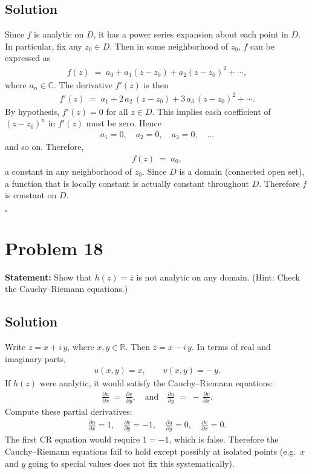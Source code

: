 \documentclass[12pt]{article}
\theoremstyle{definition} %
\theoremstyle{plain} %
\begin{document}
\subsection*{Solution}
Since $f$ is analytic on $D$, it has a power series expansion about each point in $D$.  In particular, fix any $z_0 \in D$.  Then in some neighborhood of $z_0$, $f$ can be expressed as
\begin{align}
f(z) \;=\; a_0 + a_1(z - z_0) + a_2(z - z_0)^2 + \cdots,
\end{align}
where $a_n \in \mathbb{C}$.  The derivative $f'(z)$ is then
\begin{align}
f'(z)
\;=\;
a_1 + 2\,a_2\, (z-z_0) + 3\,a_3\, (z - z_0)^2 + \cdots.
\end{align}
By hypothesis, $f'(z) = 0$ for all $z \in D$.  This implies each coefficient of $(z - z_0)^n$ in $f'(z)$ must be zero. Hence
\begin{align}
a_1 = 0, \quad a_2 = 0, \quad a_3=0,\quad \dots
\end{align}
and so on.  Therefore,
\begin{align}
f(z) \;=\; a_0,
\end{align}
a constant in any neighborhood of $z_0$.  Since $D$ is a domain (connected open set), a function that is locally constant is actually constant throughout $D$.  Therefore $f$ is constant on $D$.

\quad $\square$

\section*{Problem 18}
\textbf{Statement:} Show that $h(z) = \overline{z}$ is not analytic on any domain. (Hint: Check the Cauchy--Riemann equations.)

\subsection*{Solution}
Write $z = x + i\,y$, where $x,y \in \mathbb{R}$.  Then $\overline{z} = x - i\,y$.  In terms of real and imaginary parts,
\begin{align}
u(x,y) = x, 
\qquad
v(x,y) = -\,y.
\end{align}
If $h(z)$ were analytic, it would satisfy the Cauchy--Riemann equations:
\begin{align}
\frac{\partial u}{\partial x} 
\;=\;
\frac{\partial v}{\partial y},
\quad\text{and}\quad
\frac{\partial u}{\partial y}
\;=\;
-\,
\frac{\partial v}{\partial x}.
\end{align}
Compute these partial derivatives:
\begin{align}
\frac{\partial u}{\partial x} = 1,
\quad
\frac{\partial v}{\partial y} = -1,
\quad
\frac{\partial u}{\partial y} = 0,
\quad
\frac{\partial v}{\partial x} = 0.
\end{align}
The first CR equation would require $1 = -1$, which is false.  Therefore the Cauchy--Riemann equations fail to hold except possibly at isolated points (e.g.\ $x$ and $y$ going to special values does not fix this systematically).
\end{document}
